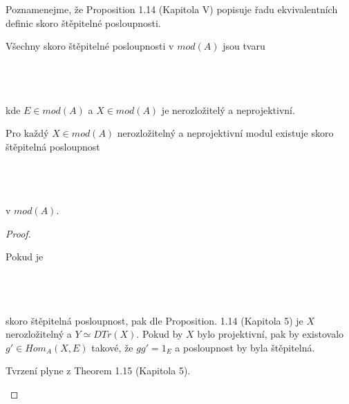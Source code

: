      Poznamenejme, že \cite{2} Proposition 1.14 (Kapitola V) popisuje řadu 
     ekvivalentních definic skoro štěpitelné posloupnosti.
     
     \begin{thm}
       \begin{description} \item
         \item[(a)] Všechny skoro štěpitelné posloupnosti v $mod(A)$ jsou tvaru 
           \\\\
           \centerline{}\\\\
           kde $E\in mod(A)$ a $X\in mod(A)$ je nerozložitelý a neprojektivní.
         \item[(b)] Pro každý $X\in mod(A)$ nerozložitelný a neprojektivní modul
           existuje skoro štěpitelná posloupnost 
           \\\\
           \centerline{} \\\\
           v $mod(A)$.
       \end{description}      
     \end{thm}
     \begin{proof}
        \begin{description}
           \item
           \item[(a)]
           Pokud je \\\\
             \centerline{}\\\\
         skoro štěpitelná posloupnost, pak dle \cite{2} Proposition. 1.14 (Kapitola 5) 
         je $X$ nerozložitelný a $Y\simeq DTr(X)$. Pokud by $X$ bylo projektivní, 
         pak by existovalo $g'\in Hom_A(X,E)$ takové, že $gg'=1_E$ a posloupnost 
         by byla štěpitelná.         
         \item[(b)] Tvrzení plyne z \cite{2} Theorem 1.15 (Kapitola 5).
       \end{description}      
     \end{proof}
     
